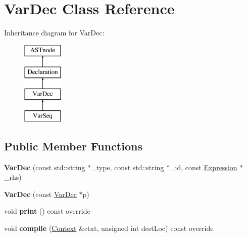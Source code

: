 \hypertarget{class_var_dec}{}\section{Var\+Dec Class Reference}
\label{class_var_dec}
Inheritance diagram for Var\+Dec\+:\begin{figure}[H]
\begin{center}
\leavevmode
\includegraphics[height=4.000000cm]{class_var_dec}
\end{center}
\end{figure}
\subsection*{Public Member Functions}
\begin{DoxyCompactItemize}
\item 
\mbox{\label{class_var_dec_a913d077202a7809a95e0b3ae304c2777}} 
{\bfseries Var\+Dec} (const std\+::string $\ast$\+\_\+type, const std\+::string $\ast$\+\_\+id, const \hyperlink{class_expression}{Expression} $\ast$\+\_\+rhs)
\item 
\mbox{\label{class_var_dec_ad0092f8b9f943682a3700013c707a8aa}} 
{\bfseries Var\+Dec} (const \hyperlink{class_var_dec}{Var\+Dec} $\ast$p)
\item 
\mbox{\label{class_var_dec_ab4b9ec0d11e8cf7f8f16320ab8c6412c}} 
void {\bfseries print} () const override
\item 
\mbox{\label{class_var_dec_a644242ce654fa31b8a97eebc7d7ef3e1}} 
void {\bfseries compile} (\hyperlink{class_context}{Context} \&ctxt, unsigned int dest\+Loc) const override
\end{DoxyCompactItemize}
